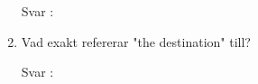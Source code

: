 \documentclass{article}
\begin{document}
\begin{enumerate}
        \begin{description}
            \item[Svar :]
        \end{description}
        
          \item Vad exakt refererar "the destination" till?
    
        \begin{description}
            \item[Svar :]
        \end{description}

        
\end{enumerate}
\end{document}
